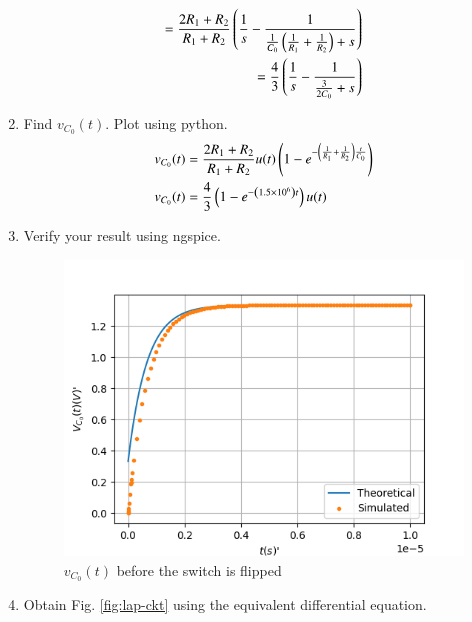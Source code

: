 \documentclass[journal,12pt,twocolumn]{IEEEtran}
\renewcommand\thesection{\arabic{section}}
\begin{document}
\begin{enumerate}[label=\arabic*.,ref=\thesection.\theenumi]
\begin{align}
	= \frac{2R_1 + R_2}{R_1 + R_2}\left(\frac{1}{s} - \frac{1}{\frac{1}{C_0}\left(\frac{1}{R_1} + \frac{1}{R_2}\right) + s}\right) \\
	= \frac{4}{3}\left(\frac{1}{s} - \frac{1}{\frac{3}{2C_0} + s}\right)
	\label{eq:V-s}
\end{align}
\item Find $v_{C_0}(t)$.  Plot using python.
\begin{align}
	& v_{C_0}(t) = \frac{2R_1 + R_2}{R_1 + R_2}u(t)\left(1 - e^{-\left(\frac{1}{R_1} + \frac{1}{R_2}\right)\frac{t}{C_0}}\right) \\
	&v_{C_0}(t) = \frac{4}{3}\left(1 - e^{-\left(1.5 \times 10^6\right)t}\right)u(t)
\end{align}
\item Verify your result using ngspice.\\
\solution
\begin{figure}[!htb]
\includegraphics[width=\columnwidth]{./figs/e2.6.png}
\caption{$v_{C_0}(t)$ before the switch is flipped}
\label{fig:v1-t}
\end{figure}
\vspace{3cm}
\item Obtain Fig. 
\ref{fig:lap-ckt}
using the equivalent differential equation.
\end{enumerate}
\end{document}
